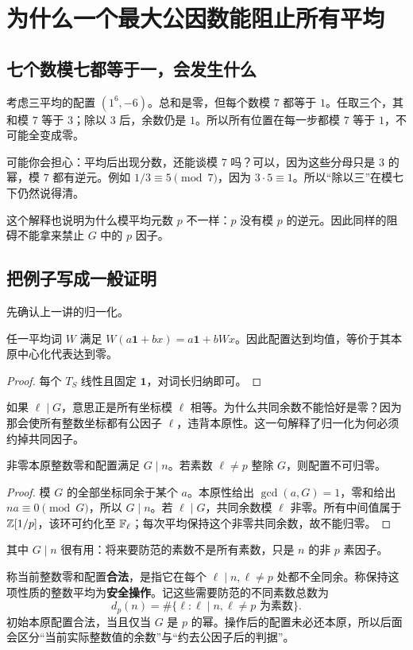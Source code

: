 \chapter{为什么一个最大公因数能阻止所有平均}\label{sec:obstruction}
\section{七个数模七都等于一，会发生什么}
考虑三平均的配置 $(1^6,-6)$。总和是零，但每个数模 $7$ 都等于 $1$。任取三个，其和模 $7$ 等于 $3$；除以 $3$ 后，余数仍是 $1$。所以所有位置在每一步都模 $7$ 等于 $1$，不可能全变成零。

可能你会担心：平均后出现分数，还能谈模 $7$ 吗？可以，因为这些分母只是 $3$ 的幂，模 $7$ 都有逆元。例如 $1/3\equiv5\pmod7$，因为 $3\cdot5\equiv1$。所以“除以三”在模七下仍然说得清。

这个解释也说明为什么模平均元数 $p$ 不一样：$p$ 没有模 $p$ 的逆元。因此同样的阻碍不能拿来禁止 $G$ 中的 $p$ 因子。

\section{把例子写成一般证明}
先确认上一讲的归一化。
\begin{lemma}[归一化与操作序列相容]\label{lem:affine}
任一平均词 $W$ 满足 $W(a\mathbf1+bx)=a\mathbf1+bWx$。因此配置达到均值，等价于其本原中心化代表达到零。
\end{lemma}
\begin{proof}
每个 $T_S$ 线性且固定 $\mathbf1$，对词长归纳即可。
\end{proof}
如果 $\ell\mid G$，意思正是所有坐标模 $\ell$ 相等。为什么共同余数不能恰好是零？因为那会使所有整数坐标都有公因子 $\ell$，违背本原性。这一句解释了归一化为何必须约掉共同因子。
\begin{lemma}[非平均素数处的共同余数障碍]\label{lem:obstruction}
非零本原整数零和配置满足 $G\mid n$。若素数 $\ell\ne p$ 整除 $G$，则配置不可归零。
\end{lemma}
\begin{proof}
模 $G$ 的全部坐标同余于某个 $a$。本原性给出 $\gcd(a,G)=1$，零和给出 $na\equiv0\pmod G$，所以 $G\mid n$。若 $\ell\mid G$，共同余数模 $\ell$ 非零。所有中间值属于 $\mathbb Z[1/p]$，该环可约化至 $\mathbb F_\ell$；每次平均保持这个非零共同余数，故不能归零。
\end{proof}
其中 $G\mid n$ 很有用：将来要防范的素数不是所有素数，只是 $n$ 的非 $p$ 素因子。

称当前整数零和配置\textbf{合法}，是指它在每个 $\ell\mid n,\ell\ne p$ 处都不全同余。称保持这项性质的整数平均为\textbf{安全操作}。记这些需要防范的不同素数总数为
\[d_p(n)=\#\{\ell:\ell\mid n,\ell\ne p\text{ 为素数}\}.
\]
初始本原配置合法，当且仅当 $G$ 是 $p$ 的幂。操作后的配置未必还本原，所以后面会区分“当前实际整数值的余数”与“约去公因子后的判据”。

